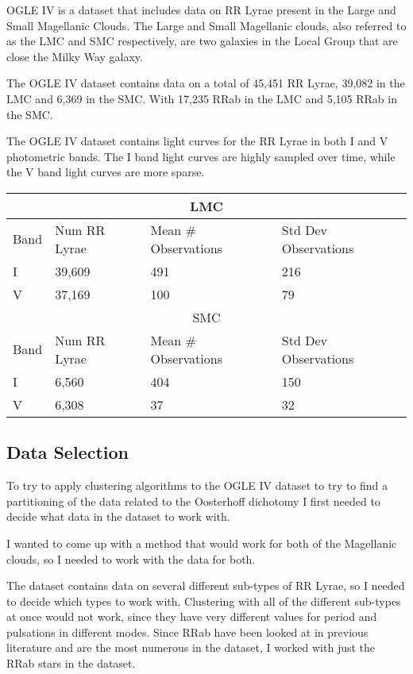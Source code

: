 \documentclass[]{article}
\begin{document}
OGLE IV is a dataset that includes data on RR Lyrae present in the Large and Small Magellanic Clouds. The Large and Small Magellanic clouds, also referred to as the LMC and SMC respectively, are two galaxies in the Local Group that are close the Milky Way galaxy. \cite{harvard_2007}

The OGLE IV dataset contains data on a total of 45,451 RR Lyrae, 39,082 in the LMC and 6,369 in the SMC. With 17,235 RRab in the LMC and 5,105 RRab in the SMC. \cite{soszynski_2016}

The OGLE IV dataset contains light curves for the RR Lyrae in both I and V photometric bands. The I band light curves are highly sampled over time, while the V band light curves are more sparse. \cite{soszynski_2016}

\begin{center}
	\begin{tabular}{|l|l|l|l|}
		\hline
		\multicolumn{4}{|c|}{LMC} \\
		\hline
		Band & Num RR Lyrae & Mean \# Observations & Std Dev Observations \\
		\hline
		I & 39,609 & 491 & 216 \\
		V & 37,169 & 100 & 79 \\
		\hline
		\multicolumn{4}{|c|}{SMC} \\
		\hline
		Band & Num RR Lyrae & Mean \# Observations & Std Dev Observations \\
		\hline
		I & 6,560 & 404 & 150 \\
		V & 6,308 & 37 & 32 \\		
		\hline
	\end{tabular}
\end{center}

\subsection{Data Selection}
To try to apply clustering algorithms to the OGLE IV dataset to try to find a partitioning of the data related to the Oosterhoff dichotomy I first needed to decide what data in the dataset to work with.

I wanted to come up with a method that would work for both of the Magellanic clouds, so I needed to work with the data for both.

The dataset contains data on several different sub-types of RR Lyrae, so I needed to decide which types to work with. Clustering with all of the different sub-types at once would not work, since they have very different values for period and pulsations in different modes. Since RRab have been looked at in previous literature and are the most numerous in the dataset, I worked with just the RRab stars in the dataset.
\end{document}
